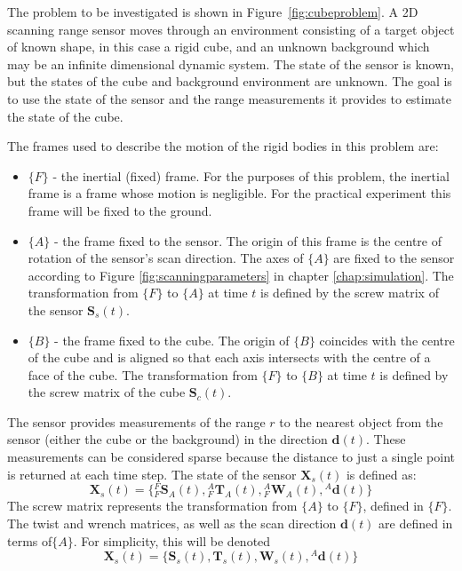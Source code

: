 The problem to be investigated is shown in Figure~\ref{fig:cubeproblem}. A 2D scanning range sensor moves through an environment consisting of a target object of known shape, in this case a rigid cube, and an unknown background which may be an infinite dimensional dynamic system. The state of the sensor is known, but the states of the cube and background environment are unknown. The goal is to use the state of the sensor and the range measurements it provides to estimate the state of the cube.

The frames used to describe the motion of the rigid bodies in this problem are:
\begin{itemize}
\item $\{F\}$ - the inertial (fixed) frame. For the purposes of this problem, the inertial frame is a frame whose motion is negligible. For the practical experiment this frame will be fixed to the ground.
\item $\{A\}$ - the frame fixed to the sensor. The origin of this frame is the centre of rotation of the sensor's scan direction. The axes of $\{A\}$ are fixed to the sensor according to Figure \ref{fig:scanningparameters} in chapter \ref{chap:simulation}. The transformation from $\{F\}$ to $\{A\}$ at time $t$ is defined by the screw matrix of the sensor $\mathbf{S}_{s}(t)$.
\item $\{B\}$ - the frame fixed to the cube. The origin of $\{B\}$ coincides with the centre of the cube and is aligned so that each axis intersects with the centre of a face of the cube. The transformation from $\{F\}$ to $\{B\}$ at time $t$ is defined by the screw matrix of the cube $\mathbf{S}_{c}(t)$.
\end{itemize} 

The sensor provides measurements of the range $r$ to the nearest object from the sensor (either the cube or the background) in the direction $\mathbf{d}(t)$. These measurements can be considered sparse because the distance to just a single point is returned at each time step. The state of the sensor $\mathbf{X}_{s}(t)$ is defined as:
\begin{equation}
	\mathbf{X}_{s}(t) = 
	\{{^{F}_{F}\mathbf{S}^{}_{A}(t)},{^{A}_{F}\mathbf{T}^{}_{A}(t)},{^{A}_{F}\mathbf{W}^{}_{A}(t)},
	{^{A}\mathbf{d}(t)}\}
\end{equation}
The screw matrix represents the transformation from $\{A\}$ to $\{F\}$, defined in $\{F\}$. The twist and wrench matrices, as well as the scan direction $\mathbf{d}(t)$ are defined in terms of$\{A\}$.
For simplicity, this will be denoted 
\begin{equation}
	\mathbf{X}_{s}(t) = 
	\{\mathbf{S}_{s}(t),\mathbf{T}_{s}(t),\mathbf{W}_{s}(t),{^{A}\mathbf{d}(t)}\}
\end{equation}

